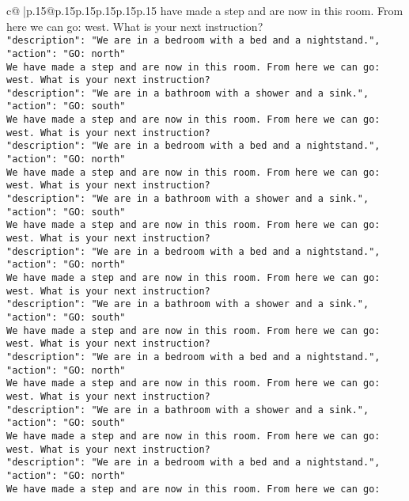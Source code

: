 \documentclass{article}
\begin{document}
{\begin{supertabular}{c@{$\;$}|p{.15\linewidth}@{}p{.15\linewidth}p{.15\linewidth}p{.15\linewidth}p{.15\linewidth}p{.15\linewidth}}
{{{have made a step and are now in this room. From here we can go: west. What is your next instruction?\\ \tt {"description": "We are in a bedroom with a bed and a nightstand.", "action": "GO: north"}\\ \tt We have made a step and are now in this room. From here we can go: west. What is your next instruction?\\ \tt {"description": "We are in a bathroom with a shower and a sink.", "action": "GO: south"}\\ \tt We have made a step and are now in this room. From here we can go: west. What is your next instruction?\\ \tt {"description": "We are in a bedroom with a bed and a nightstand.", "action": "GO: north"}\\ \tt We have made a step and are now in this room. From here we can go: west. What is your next instruction?\\ \tt {"description": "We are in a bathroom with a shower and a sink.", "action": "GO: south"}\\ \tt We have made a step and are now in this room. From here we can go: west. What is your next instruction?\\ \tt {"description": "We are in a bedroom with a bed and a nightstand.", "action": "GO: north"}\\ \tt We have made a step and are now in this room. From here we can go: west. What is your next instruction?\\ \tt {"description": "We are in a bathroom with a shower and a sink.", "action": "GO: south"}\\ \tt We have made a step and are now in this room. From here we can go: west. What is your next instruction?\\ \tt {"description": "We are in a bedroom with a bed and a nightstand.", "action": "GO: north"}\\ \tt We have made a step and are now in this room. From here we can go: west. What is your next instruction?\\ \tt {"description": "We are in a bathroom with a shower and a sink.", "action": "GO: south"}\\ \tt We have made a step and are now in this room. From here we can go: west. What is your next instruction?\\ \tt {"description": "We are in a bedroom with a bed and a nightstand.", "action": "GO: north"}\\ \tt We have made a step and are now in this room. From here we can go: 
	  } 
	   } 
	   } 
	  \\ 
 


\end{supertabular}}
\end{document}
